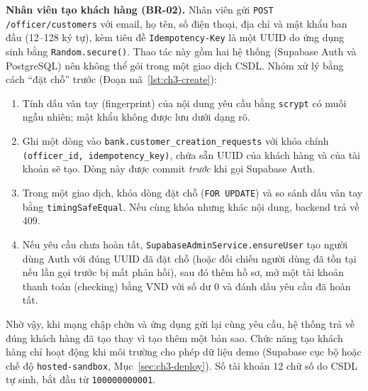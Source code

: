 \textbf{Nhân viên tạo khách hàng (BR-02).} Nhân viên gửi \texttt{POST /\allowbreak{}officer/\allowbreak{}customers} với email, họ tên, số điện thoại, địa chỉ và mật khẩu ban đầu (12--128 ký tự), kèm tiêu đề \texttt{Idempotency-\allowbreak{}Key} là một UUID do ứng dụng sinh bằng \texttt{Random.\allowbreak{}secure()}. Thao tác này gồm hai hệ thống (Supabase Auth và PostgreSQL) nên không thể gói trong một giao dịch CSDL. Nhóm xử lý bằng cách ``đặt chỗ'' trước (Đoạn mã~\ref{lst:ch3-create}):
\begin{enumerate}
	\item Tính dấu vân tay (fingerprint) của nội dung yêu cầu bằng \texttt{scrypt} có muối ngẫu nhiên; mật khẩu không được lưu dưới dạng rõ.
	\item Ghi một dòng vào \texttt{bank.\allowbreak{}customer\_\allowbreak{}creation\_\allowbreak{}requests} với khóa chính \texttt{(officer\_\allowbreak{}id, idempotency\_\allowbreak{}key)}, chứa sẵn UUID của khách hàng và của tài khoản sẽ tạo. Dòng này được commit \emph{trước} khi gọi Supabase Auth.
	\item Trong một giao dịch, khóa dòng đặt chỗ (\texttt{FOR UPDATE}) và so sánh dấu vân tay bằng \texttt{timing\allowbreak{}Safe\allowbreak{}Equal}. Nếu cùng khóa nhưng khác nội dung, backend trả về 409.
	\item Nếu yêu cầu chưa hoàn tất, \texttt{Supabase\allowbreak{}Admin\allowbreak{}Service.\allowbreak{}ensureUser} tạo người dùng Auth với đúng UUID đã đặt chỗ (hoặc đối chiếu người dùng đã tồn tại nếu lần gọi trước bị mất phản hồi), sau đó thêm hồ sơ, mở một tài khoản thanh toán (checking) bằng VND với số dư 0 và đánh dấu yêu cầu đã hoàn tất.
\end{enumerate}
Nhờ vậy, khi mạng chập chờn và ứng dụng gửi lại cùng yêu cầu, hệ thống trả về đúng khách hàng đã tạo thay vì tạo thêm một bản sao. Chức năng tạo khách hàng chỉ hoạt động khi môi trường cho phép dữ liệu demo (Supabase cục bộ hoặc chế độ \texttt{hosted-\allowbreak{}sandbox}, Mục~\ref{sec:ch3-deploy}). Số tài khoản 12 chữ số do CSDL tự sinh, bắt đầu từ \texttt{100000000001}.

